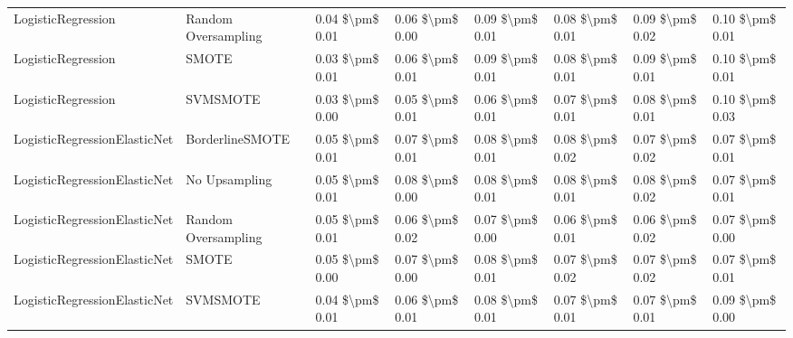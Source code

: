 \begin{tabular}{llllllll}
             LogisticRegression &           Random Oversampling & 0.04 \$\textbackslash pm\$ 0.01 &           0.06 \$\textbackslash pm\$ 0.00 &       0.09 \$\textbackslash pm\$ 0.01 &        0.08 \$\textbackslash pm\$ 0.01 &                         0.09 \$\textbackslash pm\$ 0.02 & 0.10 \$\textbackslash pm\$ 0.01 \\
             LogisticRegression &                         SMOTE & 0.03 \$\textbackslash pm\$ 0.01 &           0.06 \$\textbackslash pm\$ 0.01 &       0.09 \$\textbackslash pm\$ 0.01 &        0.08 \$\textbackslash pm\$ 0.01 &                         0.09 \$\textbackslash pm\$ 0.01 & 0.10 \$\textbackslash pm\$ 0.01 \\
             LogisticRegression &                      SVMSMOTE & 0.03 \$\textbackslash pm\$ 0.00 &           0.05 \$\textbackslash pm\$ 0.01 &       0.06 \$\textbackslash pm\$ 0.01 &        0.07 \$\textbackslash pm\$ 0.01 &                         0.08 \$\textbackslash pm\$ 0.01 & 0.10 \$\textbackslash pm\$ 0.03 \\
   LogisticRegressionElasticNet &               BorderlineSMOTE & 0.05 \$\textbackslash pm\$ 0.01 &           0.07 \$\textbackslash pm\$ 0.01 &       0.08 \$\textbackslash pm\$ 0.01 &        0.08 \$\textbackslash pm\$ 0.02 &                         0.07 \$\textbackslash pm\$ 0.02 & 0.07 \$\textbackslash pm\$ 0.01 \\
   LogisticRegressionElasticNet &                 No Upsampling & 0.05 \$\textbackslash pm\$ 0.01 &           0.08 \$\textbackslash pm\$ 0.00 &       0.08 \$\textbackslash pm\$ 0.01 &        0.08 \$\textbackslash pm\$ 0.01 &                         0.08 \$\textbackslash pm\$ 0.02 & 0.07 \$\textbackslash pm\$ 0.01 \\
   LogisticRegressionElasticNet &           Random Oversampling & 0.05 \$\textbackslash pm\$ 0.01 &           0.06 \$\textbackslash pm\$ 0.02 &       0.07 \$\textbackslash pm\$ 0.00 &        0.06 \$\textbackslash pm\$ 0.01 &                         0.06 \$\textbackslash pm\$ 0.02 & 0.07 \$\textbackslash pm\$ 0.00 \\
   LogisticRegressionElasticNet &                         SMOTE & 0.05 \$\textbackslash pm\$ 0.00 &           0.07 \$\textbackslash pm\$ 0.00 &       0.08 \$\textbackslash pm\$ 0.01 &        0.07 \$\textbackslash pm\$ 0.02 &                         0.07 \$\textbackslash pm\$ 0.02 & 0.07 \$\textbackslash pm\$ 0.01 \\
   LogisticRegressionElasticNet &                      SVMSMOTE & 0.04 \$\textbackslash pm\$ 0.01 &           0.06 \$\textbackslash pm\$ 0.01 &       0.08 \$\textbackslash pm\$ 0.01 &        0.07 \$\textbackslash pm\$ 0.01 &                         0.07 \$\textbackslash pm\$ 0.01 & 0.09 \$\textbackslash pm\$ 0.00 \\

\end{tabular}
